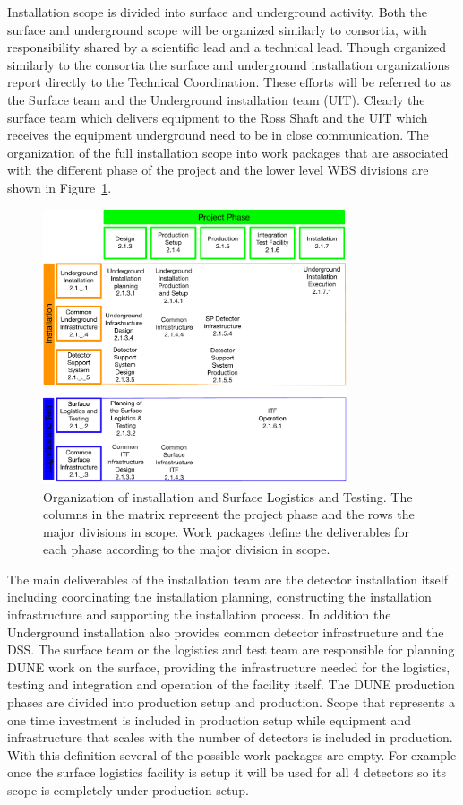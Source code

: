 Installation scope is divided into surface and underground
activity. Both the surface and underground scope will be organized
similarly to consortia, with responsibility shared by a scientific
lead and a technical lead. Though organized similarly to the consortia
the surface and underground installation organizations report directly
to the Technical Coordination. These efforts will be referred to as
the Surface team and the Underground installation team (UIT). Clearly
the surface team which delivers equipment to the Ross Shaft and the
UIT which receives the equipment underground need to be in close
communication. The organization of the full installation scope into
work packages that are associated with the different phase of the
project and the lower level WBS divisions are shown in
Figure~\ref{WP_def}.
\begin{figure}[htb]
  \begin{center}
    \includegraphics[width=0.8\textwidth]{far-detector-single-phase/figures/OrgChart-v3.pdf}
    \caption{Organization of installation and Surface Logistics and
      Testing. The columns in the matrix represent the project phase
      and the rows the major divisions in scope. Work packages define
      the deliverables for each phase according to the major division
      in scope. }
    \label{WP_def}
  \end{center}
\end{figure}
The main deliverables of the installation team are the
detector installation itself including coordinating the installation
planning, constructing the installation infrastructure and supporting
the installation process. In addition the Underground installation
also provides common detector infrastructure and the DSS. The surface
team or the logistics and test team are responsible for planning
DUNE work on the surface, providing the infrastructure needed
for the logistics, testing and integration and operation of the
facility itself. The DUNE production phases are divided into
production setup and production. Scope that represents a one time
investment is included in production setup while equipment and
infrastructure that scales with the number of detectors is included in
production. With this definition several of the possible work packages
are empty. For example once the surface logistics facility is setup it
will be used for all 4 detectors so its scope is completely under
production setup.

